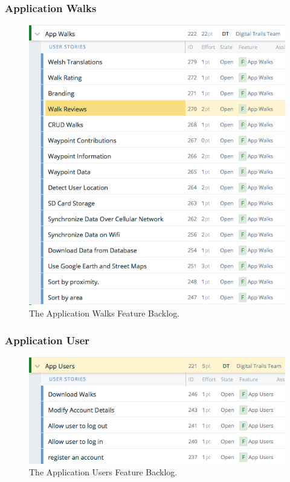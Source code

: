 \documentclass[11pt,a4paper]{article}
\begin{document}
\subsubsection{Application Walks}
\begin{figure}[H]
\centering
\includegraphics[width = 140mm]{backlog/AppWalks.png}
\caption{The Application Walks Feature Backlog.}
\label{fig:backlogappwal}
\end{figure}

\subsubsection{Application User}
\begin{figure}[H]
\centering
\includegraphics[width = 140mm]{backlog/AppUser.png}
\caption{The Application Users Feature Backlog.}
\label{fig:backlogappuser}
\end{figure}
\end{document}
